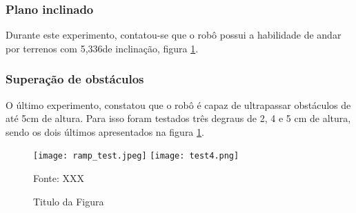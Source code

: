 \documentclass[../main.tex]{subfiles}
\begin{document}
  \subsubsection{Plano inclinado}
  Durante este experimento, contatou-se que o robô possui a habilidade de andar por terrenos com 5,336\degree de inclinação, figura \ref{fig:tests3-4}. 

  \subsubsection{Superação de obstáculos}
  O último experimento, constatou que o robô é capaz de ultrapassar obstáculos de até 5cm de altura. Para isso foram testados três degraus de 2, 4 e 5 cm de altura, sendo os dois últimos apresentados na figura \ref{fig:tests3-4}.

  \begin{figure}[h]
    \centering
    \caption{Titulo da Figura}
    \texttt{[image: ramp\_test.jpeg]}
    \texttt{[image: test4.png]}

    Fonte: XXX
    \label{fig:tests3-4}
  \end{figure}

   
\end{document}

